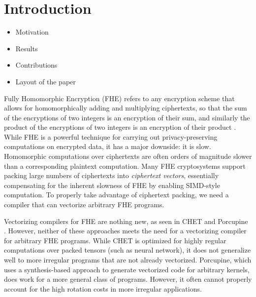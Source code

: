 \section{Introduction}\label{sec:intro}
\begin{itemize}
    \item Motivation
    \item Results
    \item Contributions
    \item Layout of the paper
\end{itemize}

Fully Homomorphic Encryption (FHE) refers to any encryption scheme that allows for homomorphically adding and multiplying ciphertexts, so that the sum of the encryptions of two integers is an encryption of their sum, and similarly the product of the encryptions of two integers is an encryption of their product \cite{Gentry}.
While FHE is a powerful technique for carrying out privacy-preserving computations on encrypted data, it has a major downside: it is slow.
Homomorphic computations over ciphertexts are often orders of magnitude slower than a corresponding plaintext computation.
Many FHE cryptosystems support packing large numbers of ciphertexts into {\em ciphertext vectors}, essentially compensating for the inherent slowness of FHE by enabling SIMD-style computation.
To properly take advantage of ciphertext packing, we need a compiler that can vectorize arbitrary FHE programs.

Vectorizing compilers for FHE are nothing new, as seen in CHET and Porcupine \cite{CHET, Porcupine}.
However, neither of these approaches meets the need for a vectorizing compiler for arbitrary FHE programs.
While CHET is optimized for highly regular computations over packed tensors (such as neural network), it does not generalize well to more irregular programs that are not already vectorized. 
Porcupine, which uses a synthesis-based approach to generate vectorized code for arbitrary kernels, does work for a more general class of programs.
However, it often cannot properly account for the high rotation costs in more irregular applications. 

